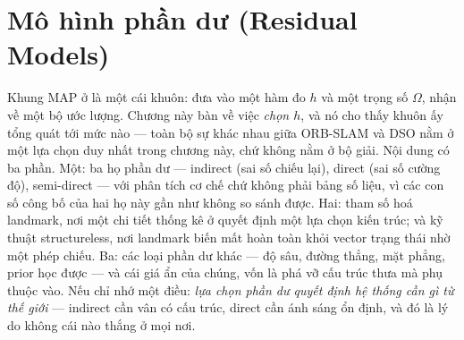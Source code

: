\documentclass[../../vslam.tex]{subfiles}
\begin{document}
\chapter{Mô hình phần dư (Residual Models)}

\begin{tomtat}
Khung MAP ở  là một cái khuôn: đưa vào một hàm đo \(h\) và một trọng số \(\Omega\), nhận về một bộ ước lượng. Chương này bàn về việc \emph{chọn \(h\)}, và nó cho thấy khuôn ấy tổng quát tới mức nào --- toàn bộ sự khác nhau giữa ORB-SLAM và DSO nằm ở một lựa chọn duy nhất trong chương này, chứ không nằm ở bộ giải. Nội dung có ba phần. Một: ba họ phần dư --- indirect (sai số chiếu lại), direct (sai số cường độ), semi-direct --- với phân tích cơ chế chứ không phải bảng số liệu, vì các con số công bố của hai họ này gần như không so sánh được. Hai: tham số hoá landmark, nơi một chi tiết thống kê ở  quyết định một lựa chọn kiến trúc; và kỹ thuật structureless, nơi landmark biến mất hoàn toàn khỏi vector trạng thái nhờ một phép chiếu. Ba: các loại phần dư khác --- độ sâu, đường thẳng, mặt phẳng, prior học được --- và cái giá ẩn của chúng, vốn là phá vỡ cấu trúc thưa mà  phụ thuộc vào. Nếu chỉ nhớ một điều: \emph{lựa chọn phần dư quyết định hệ thống cần gì từ thế giới} --- indirect cần vân có cấu trúc, direct cần ánh sáng ổn định, và đó là lý do không cái nào thắng ở mọi nơi.
\end{tomtat}
\end{document}
